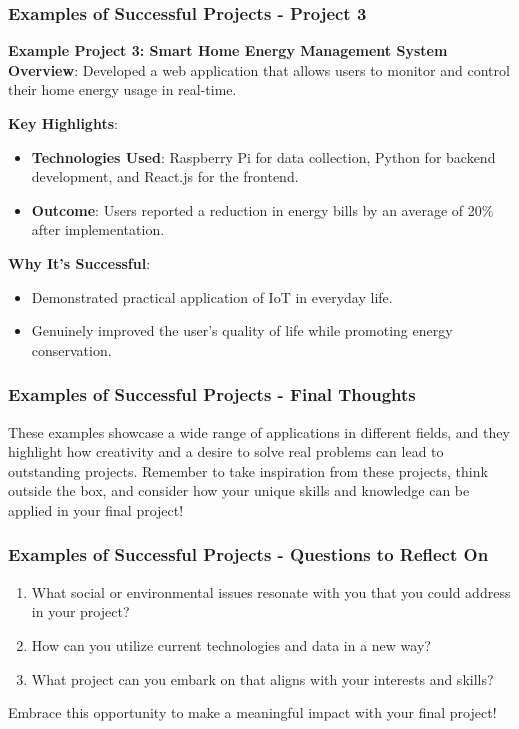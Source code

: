 \documentclass[aspectratio=169]{beamer}
\begin{document}
\begin{frame}[fragile]
    \frametitle{Examples of Successful Projects - Project 3}
    \textbf{Example Project 3: Smart Home Energy Management System} \\
    \textbf{Overview}: Developed a web application that allows users to monitor and control their home energy usage in real-time.
    
    \textbf{Key Highlights}:
    \begin{itemize}
        \item \textbf{Technologies Used}: Raspberry Pi for data collection, Python for backend development, and React.js for the frontend.
        \item \textbf{Outcome}: Users reported a reduction in energy bills by an average of 20\% after implementation.
    \end{itemize}
    
    \textbf{Why It’s Successful}:
    \begin{itemize}
        \item Demonstrated practical application of IoT in everyday life.
        \item Genuinely improved the user’s quality of life while promoting energy conservation.
    \end{itemize}
\end{frame}

\begin{frame}[fragile]
    \frametitle{Examples of Successful Projects - Final Thoughts}
    These examples showcase a wide range of applications in different fields, and they highlight how creativity and a desire to solve real problems can lead to outstanding projects. 
    Remember to take inspiration from these projects, think outside the box, and consider how your unique skills and knowledge can be applied in your final project!
\end{frame}

\begin{frame}[fragile]
    \frametitle{Examples of Successful Projects - Questions to Reflect On}
    \begin{enumerate}
        \item What social or environmental issues resonate with you that you could address in your project?
        \item How can you utilize current technologies and data in a new way?
        \item What project can you embark on that aligns with your interests and skills?
    \end{enumerate}
    Embrace this opportunity to make a meaningful impact with your final project!
\end{frame}
\end{document}
